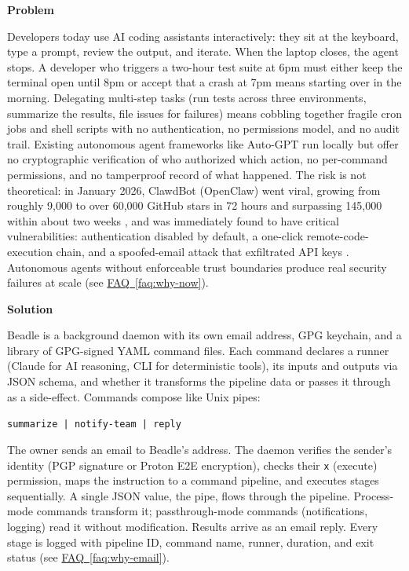 \documentclass[11pt,letterpaper]{article}
\newcommand{\prsection}[1]{%
  \vspace{1em}%
  {\large\bfseries\color{SectionBlue}#1}%
  \vspace{0.3em}\par%
}
\newcommand{\faqref}[1]{\hyperref[#1]{FAQ~\ref*{#1}}}
\begin{document}
\prsection{Problem}

Developers today use AI coding assistants interactively: they sit at the
keyboard, type a prompt, review the output, and iterate. When the laptop closes,
the agent stops. A developer who triggers a two-hour test suite at 6pm must
either keep the terminal open until 8pm or accept that a crash at 7pm means
starting over in the morning. Delegating multi-step tasks (run tests across
three environments, summarize the results, file issues for failures) means
cobbling together fragile cron jobs and shell scripts with no authentication, no
permissions model, and no audit trail. Existing autonomous agent frameworks like Auto-GPT run locally but offer
no cryptographic verification of who authorized which action, no per-command
permissions, and no tamperproof record of what happened.
The risk is not theoretical: in January 2026, ClawdBot (OpenClaw) went
viral, growing from roughly 9,000 to over 60,000 GitHub stars in 72 hours
and surpassing 145,000 within about two weeks \cite{cnbc2026openclawstars},
and was immediately found to have critical vulnerabilities: authentication
disabled by default, a one-click remote-code-execution chain, and a
spoofed-email attack that exfiltrated API keys
\cite{kaspersky2026_openclaw, socradar2026cve25253, snyk2026_clawdbot}.
Autonomous agents without enforceable trust boundaries produce real security
failures at scale (see \faqref{faq:why-now}).

\prsection{Solution}

Beadle is a background daemon with its own email address, GPG keychain,
and a library of GPG-signed YAML command files. Each command declares
a runner (Claude for AI reasoning, CLI for deterministic tools), its
inputs and outputs via JSON schema, and whether it transforms the pipeline
data or passes it through as a side-effect. Commands compose like Unix
pipes:

{\small\texttt{summarize | notify-team | reply}}

The owner sends an email to Beadle's address. The daemon verifies the
sender's identity (PGP signature or Proton E2E encryption), checks their
\texttt{x} (execute) permission, maps the instruction to a command
pipeline, and executes stages sequentially. A single JSON value, the
pipe, flows through the pipeline. Process-mode commands transform it;
passthrough-mode commands (notifications, logging) read it without
modification. Results arrive as an email reply. Every stage is logged
with pipeline ID, command name, runner, duration, and exit status
(see \faqref{faq:why-email}).
\end{document}
